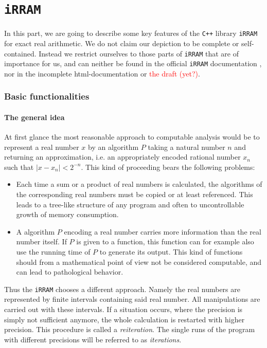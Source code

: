 \documentclass{article}
\newcommand{\irram}{\texttt{iRRAM}\xspace}
\newcommand{\cc}{\texttt{C++}\xspace}
\newcommand{\temp}[1]{\textcolor{red}{#1}}
\begin{document}
\part{\irram}

In this part, we are going to describe some key features of the \cc library \irram for exact real arithmetic. We do not claim our depiction to be complete or self-contained. Instead we restrict ourselves to those parts of \irram that are of importance for us, and can neither be found in the official \irram documentation \cite{Muller2009}, nor in the incomplete html-documentation \cite{Muller2001-2003} or \temp{the draft} \cite{Muller2013} \temp{(yet?)}.

\section{Basic functionalities}

\subsection{The general idea}

At first glance the most reasonable approach to computable analysis would be to represent a real number $x$ by an algorithm $P$ taking a natural number $n$ and returning an approximation, i.e. an appropriately encoded rational number $x_n$ such that $|x-x_n|<2^{-n}$. This kind of proceeding bears the following problems:
\begin{itemize}
\item Each time a sum or a product of real numbers is calculated, the algorithms of the corresponding real numbers must be copied or at least referenced. This leads to a tree-like structure of any program and often to uncontrollable growth of memory consumption.
\item A algorithm $P$ encoding a real number carries more information than the real number itself. If $P$ is given to a function, this function can for example also use the running time of $P$ to generate its output. This kind of functions should from a mathematical point of view not be considered computable, and can lead to pathological behavior.
\end{itemize}

Thus the \irram chooses a different approach. Namely the real numbers are represented by finite intervals containing said real number. All manipulations are carried out with these intervals. If a situation occurs, where the precision is simply not sufficient anymore, the whole calculation is restarted with higher precision. This procedure is called a \emph{reiteration}. The single runs of the program with different precisions will be referred to as \emph{iterations}.
\end{document}
